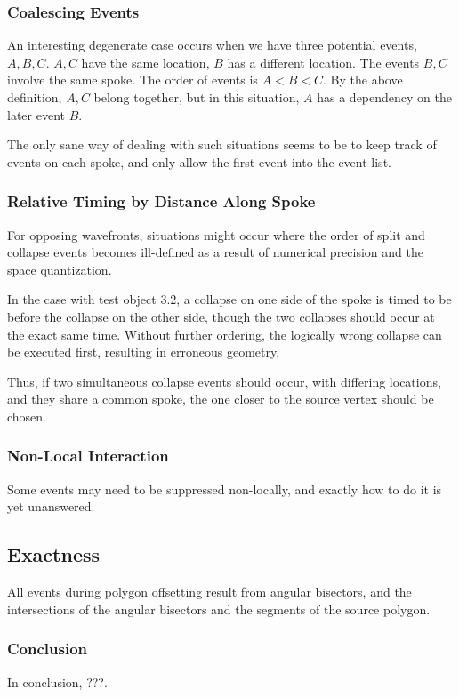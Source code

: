 \documentclass[12pt,a4paper,oneside,openany]{article}
\begin{document}
\subsubsection{Coalescing Events}

An interesting degenerate case occurs when we have three potential events, $A,B,C$. $A,C$ have the same location, $B$ has a different location. The events $B,C$ involve the same spoke. The order of events is $A < B < C$. By the above definition, $A,C$ belong together, but in this situation, $A$ has a dependency on the later event $B$.

The only sane way of dealing with such situations seems to be to keep track of events on each spoke, and only allow the first event into the event list.



\subsubsection{Relative Timing by Distance Along Spoke}

For opposing wavefronts, situations might occur where the order of split and collapse events becomes ill-defined as a result of numerical precision and the space quantization.

In the case with test object 3.2, a collapse on one side of the spoke is timed to be before the collapse on the other side, though the two collapses should occur at the exact same time. Without further ordering, the logically wrong collapse can be executed first, resulting in erroneous geometry.

Thus, if two simultaneous collapse events should occur, with differing locations, and they share a common spoke, the one closer to the source vertex should be chosen.

\subsubsection{Non-Local Interaction}

Some events may need to be suppressed non-locally, and exactly how to do it is yet unanswered.



\subsection{Exactness}

All events during polygon offsetting result from angular bisectors, and the intersections of the angular bisectors and the segments of the source polygon.

\subsubsection{Conclusion}

In conclusion, ???.


\nocite{*}



\end{document}
